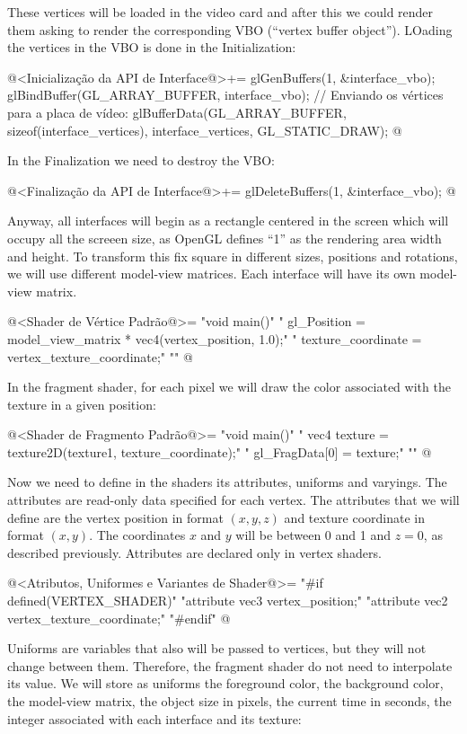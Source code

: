 These vertices will be loaded in the video card and after this we
could render them asking to render the corresponding VBO (``vertex
buffer object''). LOading the vertices in the VBO is done in the
Initialization:

\iniciocodigo
@<Inicialização da API de Interface@>+=
glGenBuffers(1, &interface_vbo);
glBindBuffer(GL_ARRAY_BUFFER, interface_vbo);
// Enviando os vértices para a placa de vídeo:
glBufferData(GL_ARRAY_BUFFER, sizeof(interface_vertices), interface_vertices,
             GL_STATIC_DRAW);
@
\fimcodigo

In the Finalization we need to destroy the VBO:

\iniciocodigo
@<Finalização da API de Interface@>+=
glDeleteBuffers(1, &interface_vbo);
@
\fimcodigo

Anyway, all interfaces will begin as a rectangle centered in the
screen which will occupy all the screeen size, as OpenGL defines ``1''
as the rendering area width and height. To transform this fix square
in different sizes, positions and rotations, we will use different
model-view matrices. Each interface will have its own model-view
matrix.

\iniciocodigo
@<Shader de Vértice Padrão@>=
"void main(){\n"
"  gl_Position = model_view_matrix * vec4(vertex_position, 1.0);\n"
"  texture_coordinate = vertex_texture_coordinate;\n"
"}\n"
@
\fimcodigo


In the fragment shader, for each pixel we will draw the color
associated with the texture in a given position:

\iniciocodigo
@<Shader de Fragmento Padrão@>=
"void main(){\n"
"  vec4 texture = texture2D(texture1, texture_coordinate);\n"
"  gl_FragData[0] = texture;\n"
"}\n"
@
\fimcodigo

Now we need to define in the shaders its attributes, uniforms and
varyings. The attributes are read-only data specified for each vertex.
The attributes that we will define are the vertex position in format
$(x, y, z)$ and texture coordinate in format $(x, y)$. The coordinates
$x$ and $y$ will be between 0 and 1 and $z=0$, as described
previously. Attributes are declared only in vertex shaders.

\iniciocodigo
@<Atributos, Uniformes e Variantes de Shader@>=
"#if defined(VERTEX_SHADER)\n"
"attribute vec3 vertex_position;\n"
"attribute vec2 vertex_texture_coordinate;\n"
"#endif\n"
@
\fimcodigo

Uniforms are variables that also will be passed to vertices, but they
will not change between them. Therefore, the fragment shader do not
need to interpolate its value. We will store as uniforms the
foreground color, the background color, the model-view matrix, the
object size in pixels, the current time in seconds, the integer
associated with each interface and its texture:

